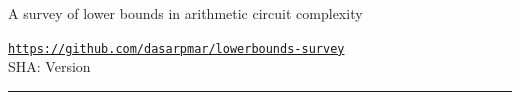 \documentclass[12pt]{report}
\author{%
    Ramprasad Saptharishi \\
    Tata Institute of Fundamental Research \\
    \texttt{ramprasad@tifr.res.in}
    }
\makeatletter
\def\printauthor{%
    {\large \@author}}
\makeatother
\begin{document}
\begin{titlepage}
\noindent
\vspace*{1cm}

\titlefont A survey of lower bounds in arithmetic circuit complexity

\vspace{1ex}
\begin{flushright}
  {\small\tt \url{https://github.com/dasarpmar/lowerbounds-survey}}\\[0.5ex]
  {\small SHA: \texttt{\gitHash}\quad{}Version \currentversion}
\end{flushright}
\null\vfill
\vspace*{1cm}
\noindent
\hfill
\begin{minipage}{0.50\linewidth}
    \begin{flushright}

      \vspace*{1cm}

        \printauthor

        \ccbyncsa


    \end{flushright}
\end{minipage}
%
\begin{minipage}{0.02\linewidth}
    \rule{1pt}{100pt}
\end{minipage}
\end{titlepage}



\end{document}
